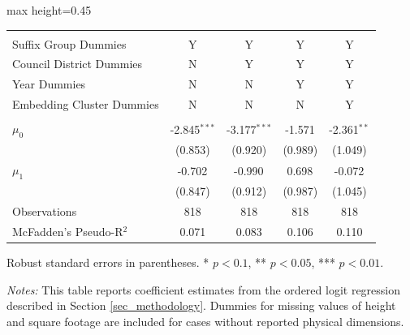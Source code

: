 \begin{table}[H]
\begin{adjustbox}{max height=0.45\textheight}
\begin{threeparttable}
\begin{tabular}{lcccc}
 & & & & \\ 
Suffix Group Dummies  & Y  & Y  & Y  & Y  \\ 
Council District Dummies  & N  & Y  & Y  & Y  \\ 
Year Dummies  & N  & N  & Y  & Y  \\ 
Embedding Cluster Dummies  & N  & N  & N  & Y  \\ 

 & & & & \\ 
$\mu_0$  & -2.845$^{***}$ & -3.177$^{***}$ & -1.571$^{}$ & -2.361$^{**}$ \\
 & (0.853) & (0.920) & (0.989) & (1.049) \\ [1.8ex]
$\mu_1$  & -0.702$^{}$ & -0.990$^{}$ & 0.698$^{}$ & -0.072$^{}$ \\
 & (0.847) & (0.912) & (0.987) & (1.045) \\ [1.8ex]
Observations  & 818 & 818 & 818 & 818 \\ [1.8ex]
McFadden's Pseudo-R$^2$ & 0.071 & 0.083 & 0.106 & 0.110 \\ [1.8ex]
\bottomrule
\end{tabular}
\begin{tablenotes}[flushleft]
\footnotesize
\item Robust standard errors in parentheses. * $p<0.1$, ** $p<0.05$, *** $p<0.01$.
\item \textit{Notes:} This table reports coefficient estimates from the ordered logit regression described in Section \ref{sec_methodology}. Dummies for missing values of height and square footage are included for cases without reported physical dimensions.
\end{tablenotes}
\end{threeparttable}
\end{adjustbox}
\end{table}
